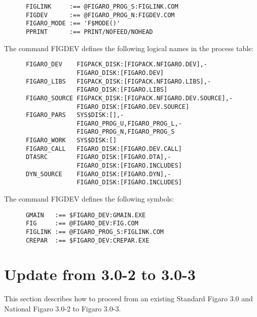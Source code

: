 \begin{verbatim}
      FIGLINK     :== @FIGARO_PROG_S:FIGLINK.COM
      FIGDEV      :== @FIGARO_PROG_N:FIGDEV.COM
      FIGARO_MODE :== 'F$MODE()'
      PPRINT      :== PRINT/NOFEED/NOHEAD
\end{verbatim}

The command FIGDEV defines the following logical names in the process table:

\begin{verbatim} 
      FIGARO_DEV    FIGPACK_DISK:[FIGPACK.NFIGARO.DEV],-
                    FIGARO_DISK:[FIGARO.DEV] 
      FIGARO_LIBS   FIGPACK_DISK:[FIGPACK.NFIGARO.LIBS],-
                    FIGARO_DISK:[FIGARO.LIBS] 
      FIGARO_SOURCE FIGPACK_DISK:[FIGPACK.NFIGARO.DEV.SOURCE],- 
                    FIGARO_DISK:[FIGARO.DEV.SOURCE]
      FIGARO_PARS   SYS$DISK:[],-
                    FIGARO_PROG_U,FIGARO_PROG_L,-
                    FIGARO_PROG_N,FIGARO_PROG_S
      FIGARO_WORK   SYS$DISK:[]
      FIGARO_CALL   FIGARO_DISK:[FIGARO.DEV.CALL] 
      DTASRC        FIGARO_DISK:[FIGARO.DTA],- 
                    FIGARO_DISK:[FIGARO.INCLUDES] 
      DYN_SOURCE    FIGARO_DISK:[FIGARO.DYN],- 
                    FIGARO_DISK:[FIGARO.INCLUDES] 
\end{verbatim}

The command FIGDEV defines the following symbols:

\begin{verbatim}
      GMAIN   :== $FIGARO_DEV:GMAIN.EXE
      FIG     :== @FIGARO_DEV:FIG.COM
      FIGLINK :== @FIGARO_PROG_S:FIGLINK.COM
      CREPAR  :== $FIGARO_DEV:CREPAR.EXE
\end{verbatim}

\section{Update from 3.0-2 to 3.0-3}
\label{update}

This section describes how to proceed from an existing Standard
Figaro 3.0 and National Figaro 3.0-2 to Figaro 3.0-3.


